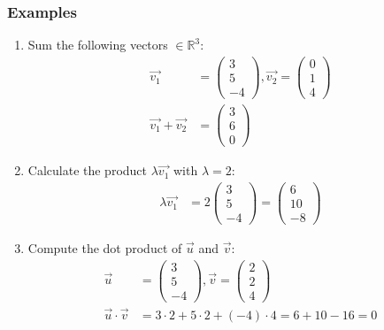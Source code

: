 \documentclass{article}
\begin{document}
\subsubsection*{Examples}
\begin{enumerate}
    \item Sum the following vectors $\in \mathbb{R}^3$:
          \begin{align*}
              \vec{v_1}             & = \begin{pmatrix} 3 \\ 5 \\ -4 \end{pmatrix}, \vec{v_2} = \begin{pmatrix} 0 \\ 1 \\ 4 \end{pmatrix} \\
              \vec{v_1} + \vec{v_2} & = \begin{pmatrix} 3 \\ 6 \\ 0 \end{pmatrix}
          \end{align*}
    \item Calculate the product $\lambda \vec{v_1}$ with $\lambda = 2$:
          \begin{align*}
              \lambda \vec{v_1} & = 2 \begin{pmatrix} 3 \\ 5 \\ -4 \end{pmatrix} = \begin{pmatrix} 6 \\ 10 \\ -8 \end{pmatrix}
          \end{align*}
    \item Compute the dot product of $\vec{u}$ and $\vec{v}$:
          \begin{align*}
              \vec{u}               & = \begin{pmatrix} 3 \\ 5 \\ -4 \end{pmatrix}, \vec{v} = \begin{pmatrix} 2 \\ 2 \\ 4 \end{pmatrix} \\
              \vec{u} \cdot \vec{v} & = 3 \cdot 2 + 5 \cdot 2 + (-4) \cdot 4 = 6 + 10 - 16 = 0
          \end{align*}
\end{enumerate}
\end{document}
